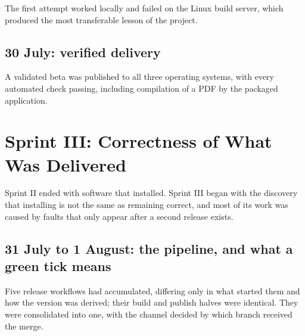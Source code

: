 \documentclass[11pt,a4paper]{article}
\begin{document}
The first attempt worked locally and failed on the Linux build server, which
produced the most transferable lesson of the project.



\subsection{30 July: verified delivery}

A validated beta was published to all three operating systems, with every
automated check passing, including compilation of a PDF by the packaged
application.

\section{Sprint III: Correctness of What Was Delivered}

Sprint II ended with software that installed. Sprint III began with the
discovery that installing is not the same as remaining correct, and most of its
work was caused by faults that only appear after a second release exists.

\subsection{31 July to 1 August: the pipeline, and what a green tick means}

Five release workflows had accumulated, differing only in what started them and
how the version was derived; their build and publish halves were identical.
They were consolidated into one, with the channel decided by which branch
received the merge.
\end{document}
